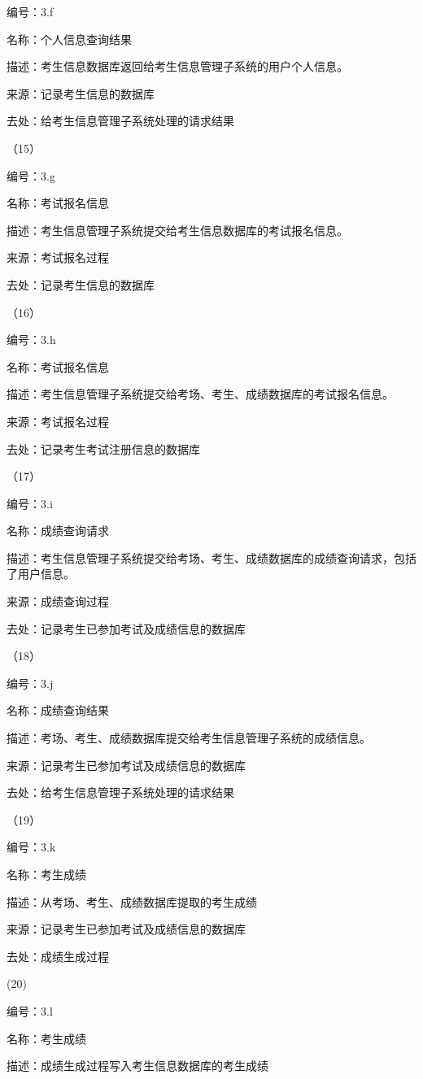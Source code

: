 编号：3.f

名称：个人信息查询结果

描述：考生信息数据库返回给考生信息管理子系统的用户个人信息。

来源：记录考生信息的数据库

去处：给考生信息管理子系统处理的请求结果

（15）

编号：3.g

名称：考试报名信息

描述：考生信息管理子系统提交给考生信息数据库的考试报名信息。

来源：考试报名过程

去处：记录考生信息的数据库

（16）

编号：3.h

名称：考试报名信息

描述：考生信息管理子系统提交给考场、考生、成绩数据库的考试报名信息。

来源：考试报名过程

去处：记录考生考试注册信息的数据库

（17）

编号：3.i

名称：成绩查询请求

描述：考生信息管理子系统提交给考场、考生、成绩数据库的成绩查询请求，包括了用户信息。

来源：成绩查询过程

去处：记录考生已参加考试及成绩信息的数据库

（18）

编号：3.j

名称：成绩查询结果

描述：考场、考生、成绩数据库提交给考生信息管理子系统的成绩信息。

来源：记录考生已参加考试及成绩信息的数据库

去处：给考生信息管理子系统处理的请求结果

（19）

编号：3.k

名称：考生成绩

描述：从考场、考生、成绩数据库提取的考生成绩

来源：记录考生已参加考试及成绩信息的数据库

去处：成绩生成过程

(20)

编号：3.l

名称：考生成绩

描述：成绩生成过程写入考生信息数据库的考生成绩

